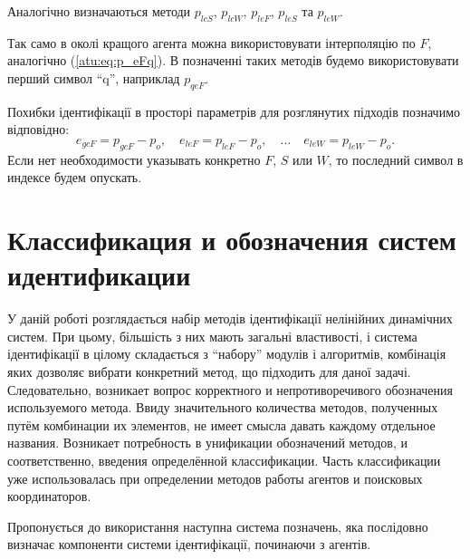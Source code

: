 Аналогічно визначаються методи
$p_{lcS}$,
$p_{lcW}$,
$p_{leF}$,
$p_{leS}$ та
$p_{leW}$.

Так само в околі кращого агента можна використовувати інтерполяцію по
$F$, аналогічно (\ref{atu:eq:p_eFq}). В позначенні таких методів будемо
використовувати перший символ ``q'', наприклад $p_{qeF}$.


Похибки ідентифікації в просторі параметрів для розглянутих підходів позначимо відповідно:
%
\begin{equation}
  e_{gcF} = p_{gcF} - p_o,
  \quad
  e_{leF} = p_{leF} - p_o,
  \quad
  \ldots
  \quad
  e_{leW} = p_{leW} - p_o.
  \label{atu:eq:e_xx}
\end{equation}
%
Если нет необходимости указывать конкретно $F$, $S$ или $W$,
то последний символ в индексе будем опускать.







\section{Классификация и обозначения систем идентификации}  %
\label{atu:id_classification}

У даній роботі розглядається набір методів ідентифікації нелінійних динамічних
систем. При цьому, більшість з них мають загальні властивості, і система
ідентифікації в цілому складається з ``набору'' модулів і алгоритмів,
комбінація яких дозволяє вибрати конкретний метод, що підходить для даної
задачі.
%
Следовательно, возникает вопрос корректного и непротиворечивого обозначения
используемого метода. Ввиду значительного количества методов, полученных
путём комбинации их элементов, не имеет смысла давать каждому
отдельное названия. Возникает потребность в унификации обозначений
методов, и соответственно, введения определённой классификации.
Часть классификации уже использовалась при
определении методов работы агентов и поисковых координаторов.

Пропонується до використання наступна система позначень, яка послідовно визначає
компоненти системи ідентифікації, починаючи з агентів.

